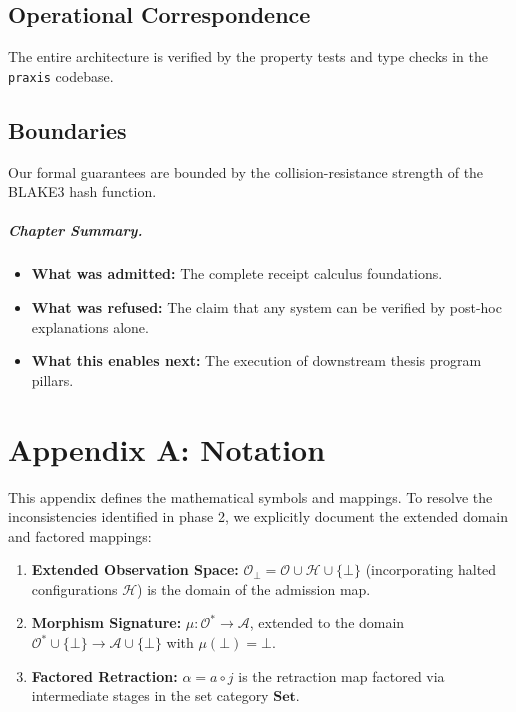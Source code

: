 \documentclass[11pt,oneside]{book}
\theoremstyle{definition}
\theoremstyle{plain}
\theoremstyle{remark}
\newcommand{\Obs}{\mathcal{O}}                 %
\newcommand{\Obsbot}{\Obs_{\bot}}             %
\newcommand{\Act}{\mathcal{A}}                 %
\newcommand{\muop}{\mu}                        %
\newcommand{\adm}{\alpha}                      %
\newcommand{\Rfsl}{\bot}                        %
\newcommand{\code}[1]{\texttt{#1}}
\begin{document}
\section{Operational Correspondence}
The entire architecture is verified by the property tests and type checks in the \code{praxis} codebase. %

\section{Boundaries}
Our formal guarantees are bounded by the collision-resistance strength of the BLAKE3 hash function. %

\paragraph{Chapter Summary.}
\begin{itemize}
  \item \textbf{What was admitted:} The complete receipt calculus foundations. %
  \item \textbf{What was refused:} The claim that any system can be verified by post-hoc explanations alone. %
  \item \textbf{What this enables next:} The execution of downstream thesis program pillars. %
\end{itemize}

\appendix

\chapter{Appendix A: Notation}
\label{app:notation}

This appendix defines the mathematical symbols and mappings. %
To resolve the inconsistencies identified in phase 2, we explicitly document the extended domain and factored mappings: %

\begin{enumerate}
  \item \textbf{Extended Observation Space:} $\Obsbot = \Obs \cup \mathcal{H} \cup \{\Rfsl\}$ (incorporating halted configurations $\mathcal{H}$) is the domain of the admission map. %
  \item \textbf{Morphism Signature:} $\muop: \Obs^* \to \Act$, extended to the domain $\Obs^* \cup \{\Rfsl\} \to \Act \cup \{\Rfsl\}$ with $\muop(\Rfsl) = \Rfsl$. %
  \item \textbf{Factored Retraction:} $\adm = a \circ j$ is the retraction map factored via intermediate stages in the set category $\mathbf{Set}$. %
\end{enumerate}
\end{document}
